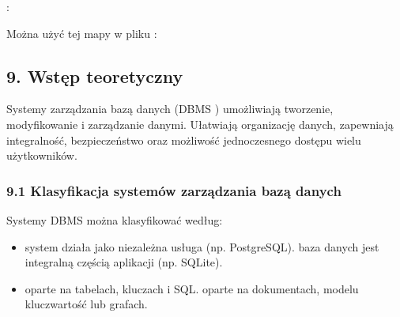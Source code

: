 \documentclass[letterpaper,10pt,polish]{sphinxmanual}
\begin{document}
\sphinxAtStartPar
{} :

\begin{sphinxVerbatim}[commandchars=\\\{\}]
              
        
\end{sphinxVerbatim}

\sphinxAtStartPar
Można użyć tej mapy w pliku :

\begin{sphinxVerbatim}[commandchars=\\\{\}]
              
\end{sphinxVerbatim}


\subsection{9. Wstęp teoretyczny}
\label{\detokenize{rozdzial2/Konfiguracja_baz_danych/Konfiguracja_baz_danych:wstep-teoretyczny}}
\sphinxAtStartPar
Systemy zarządzania bazą danych (DBMS \textendash{} ) umożliwiają tworzenie, modyfikowanie i zarządzanie danymi. Ułatwiają organizację danych, zapewniają integralność, bezpieczeństwo oraz możliwość jednoczesnego dostępu wielu użytkowników.


\subsubsection{9.1 Klasyfikacja systemów zarządzania bazą danych}
\label{\detokenize{rozdzial2/Konfiguracja_baz_danych/Konfiguracja_baz_danych:klasyfikacja-systemow-zarzadzania-baza-danych}}
\sphinxAtStartPar
Systemy DBMS można klasyfikować według:
\begin{itemize}
\item {} 
\sphinxAtStartPar
{}
\sphinxhyphen{}  \textendash{} system działa jako niezależna usługa (np. PostgreSQL).
\sphinxhyphen{}  \textendash{} baza danych jest integralną częścią aplikacji (np. SQLite).

\item {} 
\sphinxAtStartPar
{}
\sphinxhyphen{}  \textendash{} oparte na tabelach, kluczach i SQL.
\sphinxhyphen{}  \textendash{} oparte na dokumentach, modelu klucz\sphinxhyphen{}wartość lub grafach.

\end{itemize}
\end{document}
